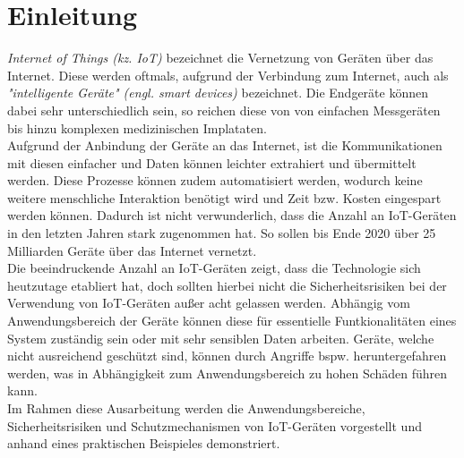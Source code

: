 \section{Einleitung}
\textit{Internet of Things (kz. IoT)} bezeichnet die Vernetzung von Geräten  über das Internet.
Diese werden oftmals, aufgrund der Verbindung zum Internet, auch als \textit{"intelligente Geräte" 
(engl. smart devices)} bezeichnet. Die Endgeräte können dabei sehr unterschiedlich sein, so reichen
diese von von einfachen Messgeräten bis hinzu komplexen medizinischen Implataten. \\

Aufgrund der Anbindung der Geräte an das Internet, ist die Kommunikationen mit diesen 
einfacher und Daten können leichter extrahiert und übermittelt werden. Diese Prozesse
können zudem automatisiert werden, wodurch keine weitere menschliche Interaktion
benötigt wird und Zeit bzw. Kosten eingespart werden können. Dadurch ist nicht verwunderlich,
dass die Anzahl an IoT-Geräten in den letzten Jahren stark zugenommen hat. So sollen bis Ende
2020 über 25 Milliarden Geräte über das Internet vernetzt.\\

Die beeindruckende Anzahl an IoT-Geräten zeigt, dass die Technologie sich heutzutage etabliert hat,
doch sollten hierbei nicht die Sicherheitsrisiken bei der Verwendung von IoT-Geräten außer acht
gelassen werden. Abhängig vom Anwendungsbereich der Geräte können diese für essentielle 
Funtkionalitäten eines System zuständig sein oder mit sehr sensiblen Daten arbeiten. 
Geräte, welche nicht ausreichend geschützt sind, können durch Angriffe bspw.  heruntergefahren
werden, was in Abhängigkeit zum Anwendungsbereich zu hohen Schäden führen kann. \\

Im Rahmen diese Ausarbeitung werden die Anwendungsbereiche, Sicherheitsrisiken und Schutzmechanismen
von IoT-Geräten vorgestellt und anhand eines praktischen Beispieles demonstriert.


  



